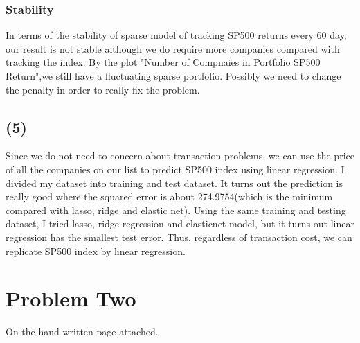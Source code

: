 \documentclass{article}\usepackage[]{graphicx}\usepackage[]{color}
\begin{document}
\subsubsection*{Stability}
In terms of the stability of sparse model of tracking SP500 returns every 60 day, our result is not stable although we do require more companies compared with tracking the index. By the plot "Number of Compnaies in Portfolio SP500 Return",we still have a fluctuating sparse portfolio. Possibly we need to change the penalty in order to really fix the problem. 

\subsection*{(5)}
Since we do not need to concern about transaction problems, we can use the price of all the companies on our list to predict SP500 index using linear regression. I divided my dataset into training and test dataset. It turns out the prediction is really good where the squared error is about 274.9754(which is the minimum compared with lasso, ridge and elastic net). Using the same training and testing dataset, I tried lasso, ridge regression and elasticnet model, but it turns out linear regression has the smallest test error. Thus, regardless of transaction cost, we can replicate SP500 index by linear regression.

\section*{Problem Two}
On the hand written page attached.
\end{document}
